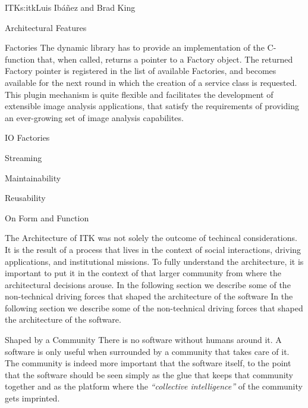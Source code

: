 \begin{aosachapter}{ITK}{s:itk}{Luis Ib\'{a}\~{n}ez and Brad King}
\begin{aosasect1}{Architectural Features}
\begin{aosasect2}{Factories}
The dynamic library has to provide an implementation of the 
C-function that, when called, returns a pointer to a Factory object. The
returned Factory pointer is registered in the list of available Factories, and
becomes available for the next round in which the creation of a service class
is requested. This plugin mechanism is quite flexible and facilitates the
development of extensible image analysis applications, that satisfy the
requirements of providing an ever-growing set of image analysis capabilites.

\end{aosasect2}

\begin{aosasect2}{IO Factories}


\end{aosasect2}

\begin{aosasect2}{Streaming}
\end{aosasect2}

\begin{aosasect2}{Maintainability}
\end{aosasect2}

\begin{aosasect2}{Reusability}
\end{aosasect2}

\end{aosasect1}

\begin{aosasect1}{On Form and Function}

The Architecture of ITK was not solely the outcome of techincal
considerations. It is the result of a process that lives in the
context of social interactions, driving applications, and
institutional missions. To fully understand the architecture, it is
important to put it in the context of that larger community from where
the architectural decisions arouse. In the following section we
describe some of the non-technical driving forces that shaped the
architecture of the software In the following section we describe some
of the non-technical driving forces that shaped the architecture of
the software.

\begin{aosasect2}{Shaped by a Community}
There is no software without humans around it. A software is only
useful when surrounded by a community that takes care of it. The
community is indeed more important that the software itself, to the
point that the software should be seen simply as the glue that keeps
that community together and as the platform where the \emph{``collective
intelligence''} of the community gets imprinted.
\end{aosasect2}


\end{aosasect1}
\end{aosachapter}
